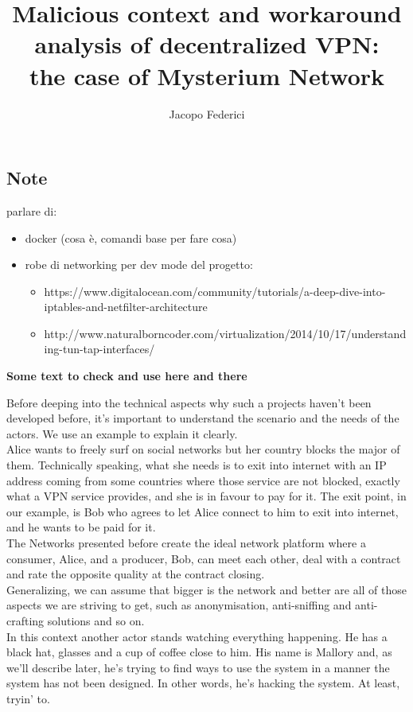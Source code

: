 \documentclass[]{article}
\title{Malicious context and workaround analysis of decentralized VPN:\\the case of Mysterium Network}
\author{Jacopo Federici}
\begin{document}
	\maketitle	
	\clearpage
	
	\tableofcontents{}

	\subsection{Note}
	parlare di:
	\begin{itemize}
		\item docker (cosa è, comandi base per fare cosa)
		\item robe di networking per dev mode del progetto:
		\begin{itemize}
			\item https://www.digitalocean.com/community/tutorials/a-deep-dive-into-iptables-and-netfilter-architecture
			\item http://www.naturalborncoder.com/virtualization/2014/10/17/understanding-tun-tap-interfaces/
		\end{itemize}
	\end{itemize}
	
	\textbf{Some text to check and use here and there}
	
	Before deeping into the technical aspects why such a projects haven't been developed before, it's important to understand the scenario and the needs of the actors. We use an example to explain it clearly.\\
	Alice wants to freely surf on social networks but her country blocks the major of them. Technically speaking, what she needs is to exit into internet with an IP address coming from some countries where those service are not blocked, exactly what a VPN service provides, and she is in favour to pay for it.
	The exit point, in our example, is Bob who agrees to let Alice connect to him to exit into internet, and he wants to be paid for it.\\
	The Networks presented before create the ideal network platform where a consumer, Alice, and a producer, Bob, can meet each other, deal with a contract and rate the opposite quality at the contract closing.\\
	Generalizing, we can assume that bigger is the network and better are all of those aspects we are striving to get, such as anonymisation, anti-sniffing and anti-crafting solutions and so on.\\
	In this context another actor stands watching everything happening. He has a black hat, glasses and a cup of coffee close to him. His name is Mallory and, as we'll describe later, he's trying to find ways to use the system in a manner the system has not been designed. In other words, he's hacking the system. At least, tryin' to.\\
	
\end{document}
